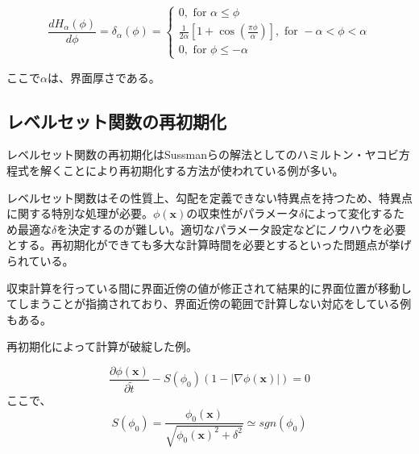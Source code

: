 \begin{equation}
\label{delta-function}
	\frac{d H_\alpha(\phi)}{d \phi} = \delta_\alpha(\phi) = \left\{\begin{array}{l}0, \text { for } \alpha \leq \phi \\ 
															\frac{1}{2 \alpha}\left[1+\cos \left(\frac{\pi \phi}{\alpha}\right)\right], \text { for }-\alpha<\phi<\alpha \\
															 0, \text { for } \phi \leq-\alpha\end{array}\right.
\end{equation}

ここで$\alpha$は、界面厚さである。



\subsection{レベルセット関数の再初期化}

レベルセット関数の再初期化はSussmanらの解法\cite{Sussman1994}としてのハミルトン・ヤコビ方程式を解くことにより再初期化する方法が使われている例が多い\cite{Himeno1999}。

レベルセット関数はその性質上、勾配を定義できない特異点を持つため、特異点に関する特別な処理が必要。$\phi(\bm{x})$の収束性がパラメータ$\delta$によって変化するため最適な$\delta$を決定するのが難しい。適切なパラメータ設定などにノウハウを必要とする。再初期化ができても多大な計算時間を必要とするといった問題点が挙げられている\cite{Yamazaki2007}。

収束計算を行っている間に界面近傍の値が修正されて結果的に界面位置が移動してしまうことが指摘されており、界面近傍の範囲で計算しない対応をしている例もある\cite{Tsubogo2003}。

再初期化によって計算が破綻した例\cite{Shono2017}。

\begin{equation}
\label{levelset-reinitialization}
	\frac{\partial \phi (\bm{x})}{\partial \tilde{t}} 
	 - S(\phi_{0})(1 - |\nabla \phi (\bm{x})|) = 0
\end{equation}
ここで、
\begin{equation}
\label{levelset-reinitialization}
	S(\phi_{0}) = \frac{\phi_{0} (\bm{x})}{\sqrt{\phi_{0}(\bm{x})^2 + \delta^2}} \simeq sgn(\phi_{0})
\end{equation}

